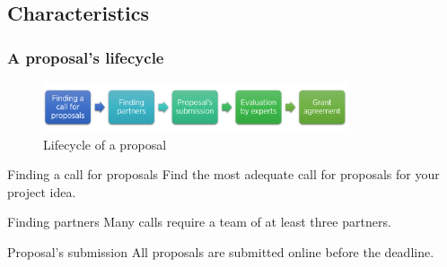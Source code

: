 \documentclass[compress,9pt,xcolor={dvipsnames,table}]{beamer}
\begin{document}
\subsection{Characteristics}
\begin{frame}\frametitle{A proposal's lifecycle}
\begin{figure}
  \centering
  \includegraphics[width=0.8\textwidth]{images/lifecycle}
  \caption{Lifecycle of a proposal}
  \label{fig:lifecycle}
\end{figure}

\begin{block}{Finding a call for proposals}
Find the most adequate call for proposals for your project idea.
\end{block}


\begin{block}{Finding partners}
Many calls require a team of at least three partners.
\end{block}

\begin{block}{Proposal's submission}
All proposals are submitted online before the deadline.
\end{block}

\end{frame}
\end{document}

